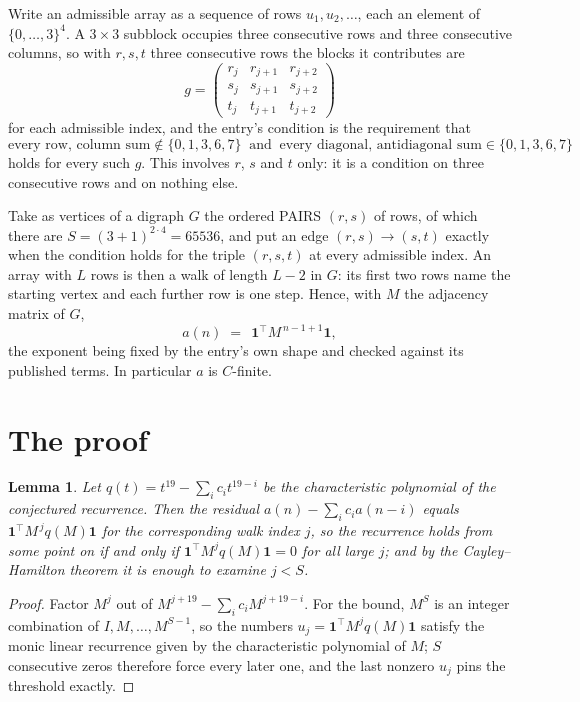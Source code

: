 \documentclass[11pt,a4paper]{article}
\theoremstyle{plain}
\newtheorem{lemma}[theorem]{Lemma}
\theoremstyle{definition}
\begin{document}
Write an admissible array as a sequence of rows $u_1,u_2,\dots$, each an element of
$\{0,\dots,3\}^{4}$. A $3\times3$ subblock occupies three consecutive rows and
three consecutive columns, so with $r,s,t$ three consecutive rows the blocks it
contributes are
\[
g=\begin{pmatrix}r_j&r_{j+1}&r_{j+2}\\ s_j&s_{j+1}&s_{j+2}\\ t_j&t_{j+1}&t_{j+2}\end{pmatrix}
\]
for each admissible index, and the entry's condition is the requirement that
\[
\text{every row, column sum} \notin \{0,1,3,6,7\}\ \text{ and }\ \text{every diagonal, antidiagonal sum} \in \{0,1,3,6,7\}
\]
holds for every such $g$. This involves $r$, $s$ and $t$ only: it is a condition on
three consecutive rows and on nothing else.

Take as vertices of a digraph $G$ the ordered PAIRS $(r,s)$ of rows, of which there are
$S=(3+1)^{2\cdot4}=65536$, and put an edge $(r,s)\to(s,t)$ exactly when the condition
holds for the triple $(r,s,t)$ at every admissible index. An array with $L$ rows is then a
walk of length $L-2$ in $G$: its first two rows name the starting vertex and each further
row is one step. Hence, with $M$ the adjacency matrix of $G$,
\[
a(n)\;=\;\,\mathbf{1}^{\!\top}M^{\,n-1+1}\mathbf{1},
\]
the exponent being fixed by the entry's own shape and checked against its published terms.
In particular $a$ is $C$-finite.

\section{The proof}

\begin{lemma}\label{lem:crit}
Let $q(t)=t^{19}-\sum_i c_it^{19-i}$ be the characteristic polynomial of the
conjectured recurrence. Then the residual $a(n)-\sum_ic_ia(n-i)$ equals
$\mathbf{1}^{\!\top}M^{\,j}q(M)\mathbf{1}$ for the corresponding walk index
$j$, so the recurrence holds from some point on if and only if
$\mathbf{1}^{\!\top}M^{j}q(M)\mathbf{1}=0$ for all large $j$; and by the
Cayley--Hamilton theorem it is enough to examine $j<S$.
\end{lemma}

\begin{proof}
Factor $M^{j}$ out of $M^{j+19}-\sum_ic_iM^{j+19-i}$. For the bound, $M^{S}$
is an integer combination of $I,M,\dots,M^{S-1}$, so the numbers
$u_j=\mathbf{1}^{\!\top}M^{j}q(M)\mathbf{1}$ satisfy the monic linear recurrence given by
the characteristic polynomial of $M$; $S$ consecutive zeros therefore force every later one,
and the last nonzero $u_j$ pins the threshold exactly.
\end{proof}
\end{document}
